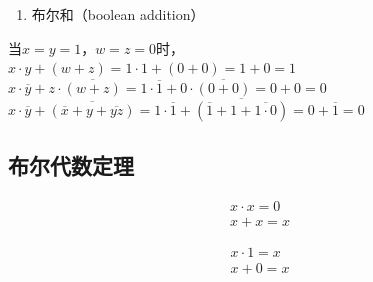 \documentclass[12pt, openany, oneside]{book}
\begin{document}
\begin{enumerate}
	\item 布尔和（boolean addition）
	      \begin{table}[H]
		      \centering
	      \end{table}
\end{enumerate}

\begin{tcolorbox}
	当$ x = y = 1 $，$ w = z = 0 $时， \\
	$ x \cdot y + (w + z) = 1 \cdot 1 + (0 + 0) = 1 + 0 = 1 $ \\
	$ x \cdot \overline y + z \cdot \overline{(w + z)} = 1 \cdot \overline 1 + 0 \cdot \overline{(0 + 0)} = 0 + 0 = 0 $ \\
	$ x \cdot \overline y + \overline{(\overline x + y + \overline{yz})} = 1 \cdot \overline 1 + \overline{(\overline 1 + 1 + \overline{1 \cdot 0})} = 0 + \overline 1 = 0 $
\end{tcolorbox}

\subsection{布尔代数定理}

\begin{tcolorbox}
	\begin{align}
		x \cdot x = 0 \\
		x + x = x
	\end{align}
\end{tcolorbox}

\begin{tcolorbox}
	\begin{align}
		x \cdot 1 = x \\
		x + 0 = x
	\end{align}
\end{tcolorbox}
\end{document}
